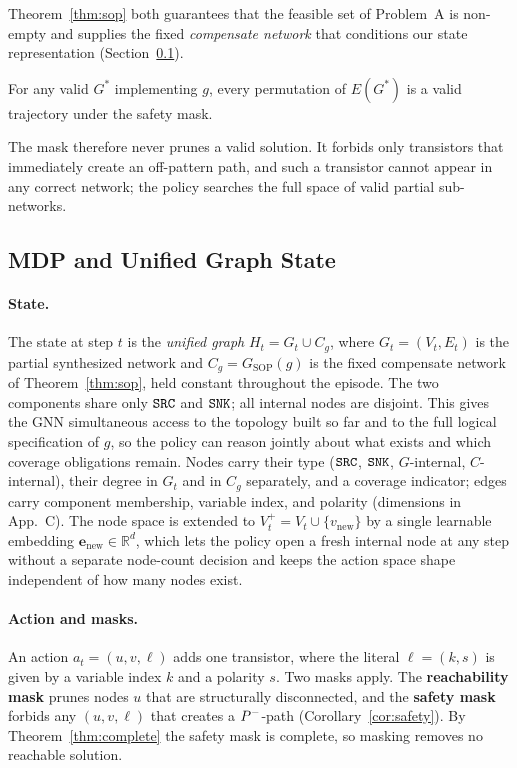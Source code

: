 \noindent
Theorem~\ref{thm:sop} both guarantees that the feasible set of Problem~A is
non-empty and supplies the fixed \emph{compensate network} that conditions our
state representation (Section~\ref{sec:mdp}).

\begin{theorem}
\label{thm:complete}
For any valid $G^*$ implementing $g$, every permutation of $E(G^*)$ is a valid
trajectory under the safety mask.
\end{theorem}

\noindent
The mask therefore never prunes a valid solution.  It forbids only
transistors that immediately create an off-pattern path, and such a transistor
cannot appear in any correct network; the policy searches the full space of
valid partial sub-networks.


\subsection{MDP and Unified Graph State}
\label{sec:mdp}

\paragraph{State.}
The state at step $t$ is the \emph{unified graph}
$H_t = G_t \cup C_g$, where $G_t = (V_t, E_t)$ is the partial
synthesized network and $C_g = G_{\mathrm{SOP}}(g)$ is the fixed compensate
network of Theorem~\ref{thm:sop}, held constant throughout the episode.
The two components share only $\texttt{SRC}$ and $\texttt{SNK}$; all internal nodes are
disjoint.
This gives the GNN simultaneous access to the topology built so far and to the
full logical specification of $g$, so the policy can reason jointly about what
exists and which coverage obligations remain.
Nodes carry their type ($\texttt{SRC}$, $\texttt{SNK}$, $G$-internal, $C$-internal), their
degree in $G_t$ and in $C_g$ separately, and a coverage indicator; edges carry
component membership, variable index, and polarity (dimensions in App.~C).
The node space is extended to $V_t^+ = V_t \cup \{v_{\mathrm{new}}\}$ by a
single learnable embedding $\mathbf{e}_{\mathrm{new}} \in \mathbb{R}^d$, which
lets the policy open a fresh internal node at any step without a separate
node-count decision and keeps the action space shape independent of how many
nodes exist.

\paragraph{Action and masks.}
An action $a_t = (u, v, \ell)$ adds one transistor, where the literal
$\ell = (k, s)$ is given by a variable index $k$ and a polarity $s$.
Two masks apply.
The \textbf{reachability mask} prunes nodes $u$ that are structurally
disconnected, and the \textbf{safety mask} forbids any $(u, v, \ell)$ that
creates a $P^{-}$-path (Corollary~\ref{cor:safety}).
By Theorem~\ref{thm:complete} the safety mask is complete, so masking removes
no reachable solution.


